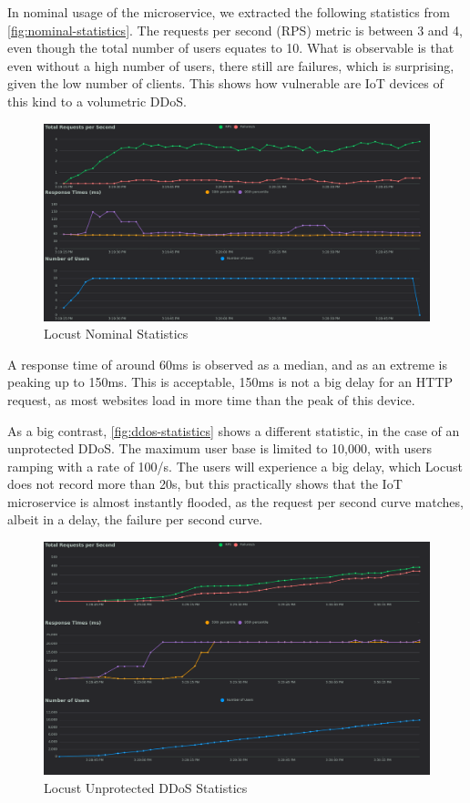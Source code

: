 In nominal usage of the microservice, we extracted the following statistics from \autoref{fig:nominal-statistics}\cite{vladescu2025}. The requests per second (RPS) metric is between 3 and 4, even though the total number of users equates to 10. What is observable is that even without a high number of users, there still are failures, which is surprising, given the low number of clients. This shows how vulnerable are IoT devices of this kind to a volumetric DDoS. 

\begin{figure}
    \centering
    \includegraphics[width=0.8\linewidth]{images/nominal_usage.png}
    \caption{Locust Nominal Statistics}
    \label{fig:nominal-statistics}
\end{figure}

A response time of around 60ms is observed as a median, and as an extreme is peaking up to 150ms. This is acceptable, 150ms is not a big delay for an HTTP request, as most websites load in more time than the peak of this device.

As a big contrast, \autoref{fig:ddos-statistics}\cite{vladescu2025} shows a different statistic, in the case of an unprotected DDoS. The maximum user base is limited to 10,000, with users ramping with a rate of 100/s. The users will experience a big delay, which Locust does not record more than 20s, but this practically shows that the IoT microservice is almost instantly flooded, as the request per second curve matches, albeit in a delay, the failure per second curve.

\begin{figure}
    \centering
    \includegraphics[width=0.8\linewidth]{images/ddos_usage.png}
    \caption{Locust Unprotected DDoS Statistics}
    \label{fig:ddos-statistics}
\end{figure}

